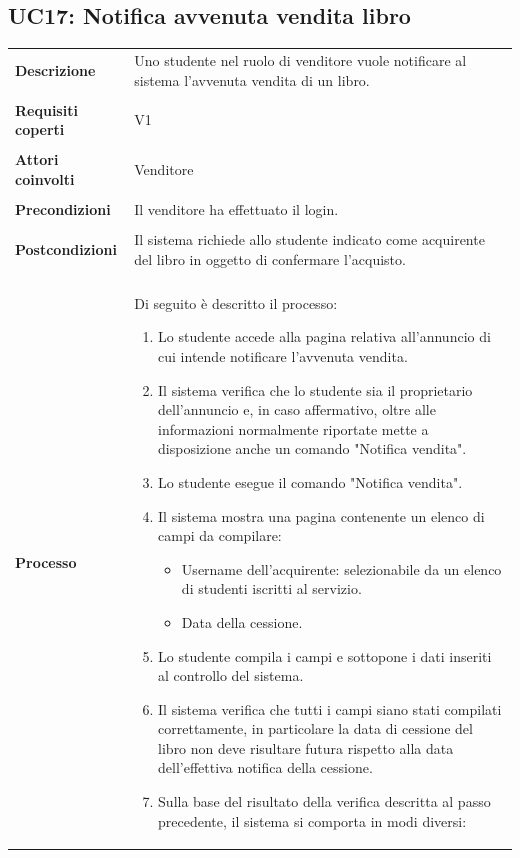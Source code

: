\documentclass[10pt,a4paper]{report}
\begin{document}
	\subsection{UC17: Notifica avvenuta vendita libro}
	\begin{tabular}{lp{}}
		\textbf{Descrizione}&Uno studente nel ruolo di venditore vuole notificare al sistema l'avvenuta vendita di un libro.\\
		\\
		\textbf{Requisiti coperti}&V1\\
		\\
		\textbf{Attori coinvolti}&Venditore\\
		\\
		\textbf{Precondizioni}&Il venditore ha effettuato il login.\\
		\\
		\textbf{Postcondizioni}&Il sistema richiede allo studente indicato come acquirente del libro in oggetto di confermare l'acquisto.\\
		\\
		\textbf{Processo}&Di seguito è descritto il processo:
		\begin{enumerate}
			\item Lo studente accede alla pagina relativa all'annuncio di cui intende notificare l'avvenuta vendita.
			\item Il sistema verifica che lo studente sia il proprietario dell'annuncio e, in caso affermativo, oltre alle informazioni normalmente riportate mette a disposizione anche un comando "Notifica vendita".
			\item Lo studente esegue il comando "Notifica vendita".
			\item Il sistema mostra una pagina contenente un elenco di campi da compilare:
			\begin{itemize}
				\item Username dell'acquirente: selezionabile da un elenco di studenti iscritti al servizio.
				\item Data della cessione.
			\end{itemize}
			\item Lo studente compila i campi e sottopone i dati inseriti al controllo del sistema.
			\item Il sistema verifica che tutti i campi siano stati compilati correttamente, in particolare la data di cessione del libro non deve risultare futura rispetto alla data dell'effettiva notifica della cessione.
			\item Sulla base del risultato della verifica descritta al passo precedente, il sistema si comporta in modi diversi:

\end{enumerate}
\end{tabular}
\end{document}
